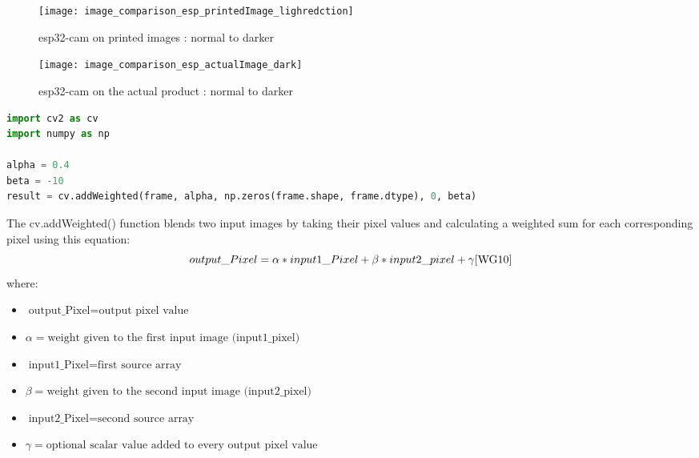 \FloatBarrier
\FloatBarrier
\begin{figure}[h]
\FloatBarrier
         \centering
        \texttt{[image: image\_comparison\_esp\_printedImage\_lighredction]}
   
        \caption{esp32-cam on printed images : normal to darker}
        \label{fig:Phone's images : normal to darker}
\FloatBarrier
    \end{figure}


\FloatBarrier
\FloatBarrier
\begin{figure}[h]
\FloatBarrier
         \centering
        \texttt{[image: image\_comparison\_esp\_actualImage\_dark]}
   
        \caption{esp32-cam on the actual product : normal to darker}
        \label{fig:Phone's images : normal to darker}
\FloatBarrier
    \end{figure}


\FloatBarrier
\begin{lstlisting}[language=Python]
import cv2 as cv
import numpy as np

alpha = 0.4
beta = -10
result = cv.addWeighted(frame, alpha, np.zeros(frame.shape, frame.dtype), 0, beta)
\end{lstlisting}


The cv.addWeighted() function blends two input images by taking their pixel values and calculating a weighted sum for each corresponding pixel \cite{WG10} using this equation:\\
\begin{equation}
output\_Pixel = \alpha * input1\_Pixel +\beta * input2\_pixel + \gamma \cite{WG10} 
\end{equation}
where: \\
\begin{itemize}
\item $\text{output\_Pixel} = \text{output pixel value}$
\item $\alpha = \text{weight given to the first input image (input1\_pixel)}$
\item $\text{input1\_Pixel} = \text{first source array}$
\item $\beta = \text{weight given to the second input image (input2\_pixel)}$
\item $\text{input2\_Pixel} = \text{second source array}$
\item $\gamma = \text{optional scalar value added to every output pixel value}$
\end{itemize}
